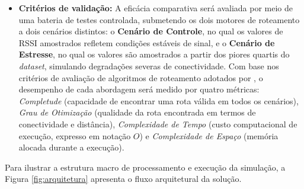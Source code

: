\documentclass[
    12pt,                %
    openright,           %
    oneside,             %
    a4paper,             %
    english,             %
    brazil               %
]{abntex2}
\begin{document}
\begin{itemize}
\item \textbf{Critérios de validação:} A eficácia comparativa será avaliada por
meio de uma bateria de testes controlada, submetendo os dois motores de roteamento
a dois cenários distintos: o \textbf{Cenário de Controle}, no qual os valores de
RSSI amostrados refletem condições estáveis de sinal, e o \textbf{Cenário de
Estresse}, no qual os valores são amostrados a partir dos piores quartis do
\textit{dataset}, simulando degradações severas de conectividade. Com base nos
critérios de avaliação de algoritmos de roteamento adotados por ,
o desempenho de cada abordagem será medido por quatro métricas: \textit{Completude}
(capacidade de encontrar uma rota válida em todos os cenários), \textit{Grau de
Otimização} (qualidade da rota encontrada em termos de conectividade e distância),
\textit{Complexidade de Tempo} (custo computacional de execução, expresso em
notação $O$) e \textit{Complexidade de Espaço} (memória alocada durante a
execução).

\end{itemize}
Para ilustrar a estrutura macro de processamento e execução da simulação, a Figura
\ref{fig:arquitetura} apresenta o fluxo arquitetural da solução.
\end{document}

